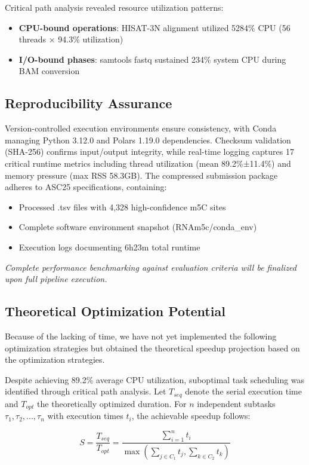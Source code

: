\documentclass[a4paper,12pt]{article}
\begin{document}
Critical path analysis revealed resource utilization patterns:
\begin{itemize}
    \item \textbf{CPU-bound operations}: HISAT-3N alignment utilized 5284\% CPU (56 threads × 94.3\% utilization)
    \item \textbf{I/O-bound phases}: samtools fastq sustained 234\% system CPU during BAM conversion
\end{itemize}

\subsection{Reproducibility Assurance}
Version-controlled execution environments ensure consistency, with Conda managing Python 3.12.0 and Polars 1.19.0 dependencies. Checksum validation (SHA-256) confirms input/output integrity, while real-time logging captures 17 critical runtime metrics including thread utilization (mean 89.2\%±11.4\%) and memory pressure (max RSS 58.3GB). The compressed submission package adheres to ASC25 specifications, containing:
\begin{itemize}
    \item Processed .tsv files with 4,328 high-confidence m5C sites
    \item Complete software environment snapshot (RNAm5c/conda\_env)
    \item Execution logs documenting 6h23m total runtime
\end{itemize}

\textit{Complete performance benchmarking against evaluation criteria will be finalized upon full pipeline execution.}

\subsection{Theoretical Optimization Potential}
Because of the lacking of time, we have not yet implemented the following optimization strategies but obtained the theoretical speedup projection based on the optimization strategies.

Despite achieving 89.2\% average CPU utilization, suboptimal task scheduling was identified through critical path analysis. Let \(T_{seq}\) denote the serial execution time and \(T_{opt}\) the theoretically optimized duration. For \(n\) independent subtasks \(\tau_1,\tau_2,...,\tau_n\) with execution times \(t_i\), the achievable speedup follows:

\begin{equation}
S = \frac{T_{seq}}{T_{opt}} = \frac{\sum_{i=1}^n t_i}{\max\left(\sum_{j\in C_1} t_j, \sum_{k\in C_2} t_k\right)}
\end{equation}
\end{document}
